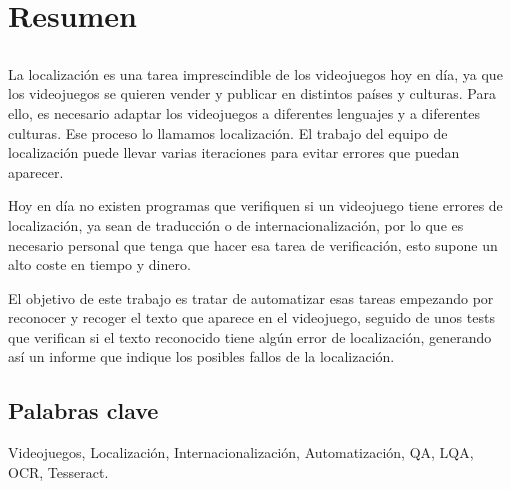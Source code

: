 \chapter*{Resumen}

\section*{\tituloPortadaVal}

La localización es una tarea imprescindible de los videojuegos hoy en día, ya que los videojuegos se quieren vender y publicar en distintos países y culturas. Para ello, es necesario adaptar los videojuegos a diferentes lenguajes y a diferentes culturas. Ese proceso lo llamamos localización. El trabajo del equipo de localización puede llevar varias iteraciones  para evitar errores que puedan aparecer.

Hoy en día no existen programas que verifiquen si un videojuego tiene errores de localización, ya sean de traducción o de internacionalización, por lo que es necesario personal que tenga que hacer esa tarea de verificación, esto supone un alto coste en tiempo y dinero.

El objetivo de este trabajo es tratar de automatizar esas tareas empezando por reconocer y recoger el texto que aparece en el videojuego, seguido de unos tests que verifican si el texto reconocido tiene algún error de localización, generando así un informe que indique los posibles fallos de la localización.



\section*{Palabras clave}
   
\noindent Videojuegos, Localización, Internacionalización, Automatización, QA, LQA, OCR, Tesseract.

   


